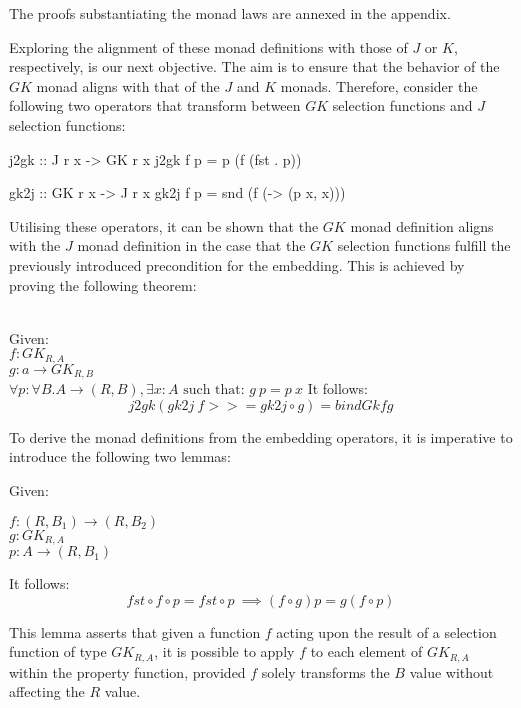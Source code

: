 \documentclass[runningheads]{llncs}
\newenvironment{reasoning}{\begin{adjustwidth}{0.2in}{}}{\end{adjustwidth}}
\begin{document}
The proofs substantiating the monad laws are annexed in the appendix.

Exploring the alignment of these monad definitions with those of \(J\)
or \(K\), respectively, is our next objective. The aim is to ensure that
the behavior of the \(GK\) monad aligns with that of the \(J\) and \(K\)
monads. Therefore, consider the following two operators that transform
between \(GK\) selection functions and \(J\) selection functions:

\begin{code}
j2gk :: J r x -> GK r x
j2gk f p = p (f (fst . p))
\end{code}

\begin{code}
gk2j :: GK r x -> J r x
gk2j f p = snd (f (\x -> (p x, x)))
\end{code}

Utilising these operators, it can be shown that the \(GK\) monad
definition aligns with the \(J\) monad definition in the case that the
\(GK\) selection functions fulfill the previously introduced
precondition for the embedding. This is achieved by proving the
following theorem:

\begin{theorem}\\
Given:\\
  $f : GK_{R,A} $\\
  $g : a \rightarrow GK_{R,B} $\\
  $\forall p : \forall B . A \rightarrow (R,B), \exists x : A \text{ such that: } 
  g\:p = p\:x$
It follows:
  \[j2gk (gk2j\:f >>= gk2j \circ g) = bindGk f g\]
\end{theorem}

To derive the monad definitions from the embedding operators, it is
imperative to introduce the following two lemmas:

\begin{lemma}
Given:
\begin{reasoning}
$f : (R,B_1) \rightarrow (R,B_2)$\\
$g : GK_{R,A}$\\
$p : A \rightarrow (R,B_1)$
\end{reasoning}
It follows:
\[fst \circ f \circ p = fst \circ p\ \implies (f \circ g)p = g (f \circ p)\]
\end{lemma}

This lemma asserts that given a function \(f\) acting upon the result of
a selection function of type \(GK_{R,A}\), it is possible to apply \(f\)
to each element of \(GK_{R,A}\) within the property function, provided
\(f\) solely transforms the \(B\) value without affecting the \(R\)
value.
\end{document}
